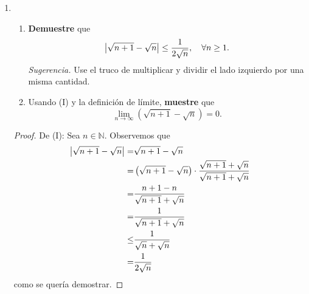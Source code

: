 \documentclass[12pt]{article}
\begin{document}
\begin{enumerate}
\begin{proof}
\begin{equation*}
        \end{equation*}
        por tanto, de la definición de límite se sigue que $\lim_{n\rightarrow\infty}\sqrt{\abs{x_n}}=0$.
        \qed
    \end{proof}
    \item \begin{enumerate}
        \item \textbf{Demuestre} que
            \begin{equation*}
                \left| \sqrt{n+1}-\sqrt{n} \right|\leq\frac{1}{2\sqrt{n}},\quad \forall n\geq 1.
            \end{equation*}
            \textit{Sugerencia.} Use el truco de multiplicar y dividir el lado izquierdo por una misma cantidad.
        \item Usando (I) y la definición de límite, \textbf{muestre} que
            \begin{equation*}
                \lim_{n\rightarrow\infty}\left(\sqrt{n+1}-\sqrt{n}\right)=0.
            \end{equation*}
        \end{enumerate}
    \begin{proof}
        De (I): Sea $n\in\mathbb{N}$. Observemos que
        \begin{equation*}
            \begin{split}
                \left| \sqrt{n+1}-\sqrt{n} \right|=&\sqrt{n+1}-\sqrt{n}\\
                =&\left(\sqrt{n+1}-\sqrt{n}\right)\cdot\frac{\sqrt{n+1}+\sqrt{n}}{\sqrt{n+1}+\sqrt{n}}\\
                =&\frac{n+1-n}{\sqrt{n+1}+\sqrt{n}}\\
                =&\frac{1}{\sqrt{n+1}+\sqrt{n}}\\
                \leq&\frac{1}{\sqrt{n}+\sqrt{n}}\\
                =&\frac{1}{2\sqrt{n}}\\
            \end{split}
        \end{equation*}
        como se quería demostrar.


\end{proof}
\end{enumerate}
\end{document}
